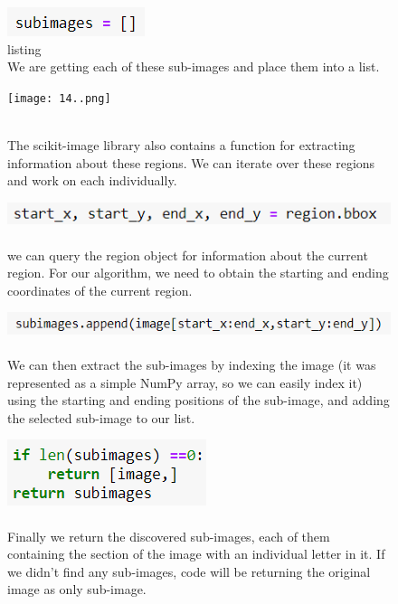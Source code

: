 \documentclass[onecolumn]{article}
\begin{document}
\begin{figure}[h]
    \centering
    \includegraphics[width=.2\linewidth]{13..png}
\caption{\label{fig:demo-bad}
\centering
listing\\We are getting each of these sub-images and place them into a list.}
\end{figure}

\begin{figure}[h]
    \centering
    \texttt{[image: 14..png]}
\caption{\label{fig:demo-bad}
\centering
\\The scikit-image library also contains a function for extracting information about these regions. We can iterate over these regions and work on each individually.}
\end{figure}

\begin{figure}[hb!]
    \centering
    \includegraphics[width=.5\linewidth]{15..png}
\caption{\label{fig:demo-bad}
\centering
\\we can query the region object for information about the current region. For our algorithm, we need to obtain the starting and ending coordinates of the current region.}
\end{figure}

\begin{figure}[hb!]
    \centering
    \includegraphics[width=.6\linewidth]{16..png}
\caption{\label{fig:demo-bad}
\centering
\\We can then extract the sub-images by indexing the image (it was represented as a simple NumPy array, so we can easily index it) using the starting and ending positions of the sub-image, and adding the selected sub-image to our list.}
\end{figure}

\begin{figure}[hb!]
    \centering
    \includegraphics[width=.3\linewidth]{17..png}
\caption{\label{fig:demo-bad}
\centering
\\Finally  we return the discovered sub-images, each of them containing the section of the image with an individual letter in it. If we didn't find any sub-images, code will be returning the original image as only sub-image.}
\end{figure}
\end{document}
